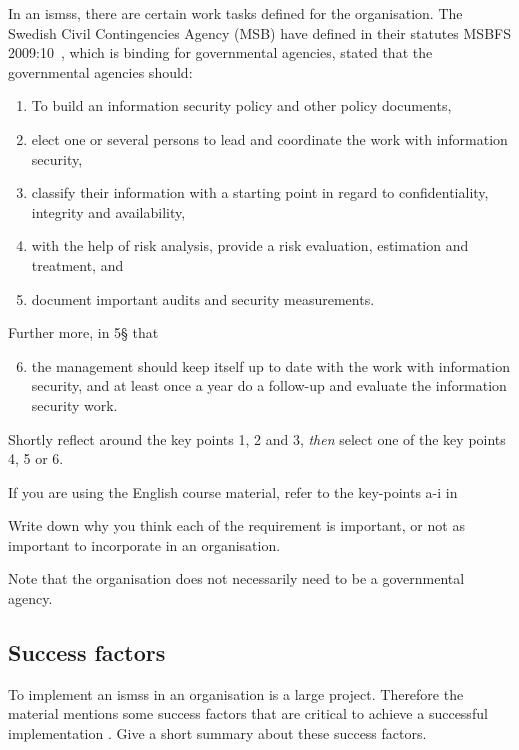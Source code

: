 \documentclass[a4paper]{llncs}
\begin{document}
In an \acp{isms}, there are certain work tasks defined for the organisation.
The Swedish Civil Contingencies Agency (MSB) have defined in their statutes
MSBFS 2009:10~\cite{MSBFS2009:10}, which is binding for governmental agencies, 
stated that the governmental agencies should:
\begin{enumerate}
  \item To build an information security policy and other policy documents,
  \item elect one or several persons to lead and coordinate the work with
    information security,
  \item classify their information with a starting point in regard to
    confidentiality, integrity and availability,
  \item with the help of risk analysis, provide a risk evaluation, estimation
    and treatment, and
  \item document important audits and security measurements.
\end{enumerate}
Further more, in 5§ that

\begin{enumerate}\setcounter{enumi}{5}
  \item the management should keep itself up to date with the work with
    information security, and at least once a year do a follow-up and evaluate
    the information security work.
\end{enumerate}

Shortly reflect around the key points 1, 2 and 3, \emph{then} select one of the key
points 4, 5 or 6.

If you are using the English course material, refer to the key-points a-i in
\cite[chap. 3.2.1]{iso27000}

Write down why you think each of the requirement is important, or not as
important to incorporate in an organisation.

Note that the organisation does not necessarily need to be a governmental
agency.

\subsection{Success factors}

To implement an \acp{isms} in an organisation is a large project. Therefore
the material mentions some success factors that are critical to achieve a
successful implementation \cite[3.6]{iso27000}. Give a short summary about
these success factors.
\end{document}
